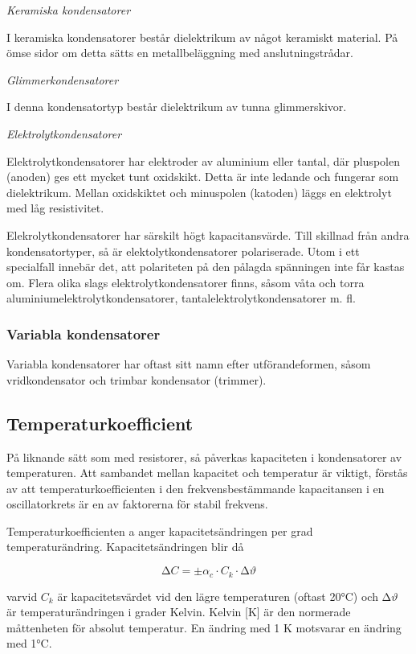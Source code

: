 \emph{Keramiska kondensatorer}

I keramiska kondensatorer består dielektrikum av något keramiskt material. På
ömse sidor om detta sätts en metallbeläggning med anslutningstrådar.

\emph{Glimmerkondensatorer}

I denna kondensatortyp består dielektrikum av tunna glimmerskivor.

\emph{Elektrolytkondensatorer}

Elektrolytkondensatorer har elektroder av aluminium eller tantal, där pluspolen
(anoden) ges ett mycket tunt oxidskikt. Detta är inte ledande och fungerar som
dielektrikum. Mellan oxidskiktet och minuspolen (katoden) läggs en elektrolyt
med låg resistivitet.

Elekrolytkondensatorer har särskilt högt kapacitansvärde. Till skillnad från
andra kondensatortyper, så är elektolytkondensatorer polariserade. Utom i ett
specialfall innebär det, att polariteten på den pålagda spänningen inte får
kastas om. Flera olika slags elektrolytkondensatorer finns, såsom våta
och torra aluminiumelektrolytkondensatorer, tantalelektrolytkondensatorer m. fl.

\subsubsection{Variabla kondensatorer}
Variabla kondensatorer har oftast sitt namn efter utförandeformen, såsom
vridkondensator och trimbar kondensator (trimmer).

\subsection{Temperaturkoefficient}

På liknande sätt som med resistorer, så påverkas kapaciteten i kondensatorer av
temperaturen. Att sambandet mellan kapacitet och temperatur är viktigt, förstås
av att temperaturkoefficienten i den frekvensbestämmande kapacitansen i en
oscillatorkrets är en av faktorerna för stabil frekvens.

Temperaturkoefficienten a anger kapacitetsändringen per grad temperaturändring.
Kapacitetsändringen blir då

\[∆C = \pm \alpha _c \cdot C_k \cdot ∆\vartheta\]

varvid \(C_k\) är kapacitetsvärdet vid den lägre temperaturen (oftast 20°C) och
\(∆\vartheta\) är temperaturändringen i grader Kelvin.
Kelvin [K] är den normerade måttenheten för absolut temperatur.
En ändring med 1 K motsvarar en ändring med 1°C.

